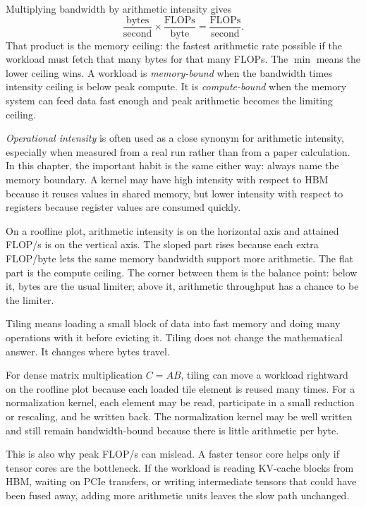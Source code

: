 Multiplying bandwidth by arithmetic intensity gives
\[
  \frac{\text{bytes}}{\text{second}}
  \times
  \frac{\text{FLOPs}}{\text{byte}}
  =
  \frac{\text{FLOPs}}{\text{second}}.
\]
That product is the memory ceiling: the fastest arithmetic rate possible if the workload must fetch that many bytes for that many FLOPs. The \(\min\) means the lower ceiling wins. A workload is \emph{memory-bound} when the bandwidth times intensity ceiling is below peak compute. It is \emph{compute-bound} when the memory system can feed data fast enough and peak arithmetic becomes the limiting ceiling.

\emph{Operational intensity} is often used as a close synonym for arithmetic intensity, especially when measured from a real run rather than from a paper calculation. In this chapter, the important habit is the same either way: always name the memory boundary. A kernel may have high intensity with respect to HBM because it reuses values in shared memory, but lower intensity with respect to registers because register values are consumed quickly.

On a roofline plot, arithmetic intensity is on the horizontal axis and attained FLOP/s is on the vertical axis. The sloped part rises because each extra FLOP/byte lets the same memory bandwidth support more arithmetic. The flat part is the compute ceiling. The corner between them is the balance point: below it, bytes are the usual limiter; above it, arithmetic throughput has a chance to be the limiter.

\begin{aside}
Tiling means loading a small block of data into fast memory and doing many operations with it before evicting it. Tiling does not change the mathematical answer. It changes where bytes travel.
\end{aside}

For dense matrix multiplication \(C = AB\), tiling can move a workload rightward on the roofline plot because each loaded tile element is reused many times. For a normalization kernel, each element may be read, participate in a small reduction or rescaling, and be written back. The normalization kernel may be well written and still remain bandwidth-bound because there is little arithmetic per byte.

This is also why peak FLOP/s can mislead. A faster tensor core helps only if tensor cores are the bottleneck. If the workload is reading KV-cache blocks from HBM, waiting on PCIe transfers, or writing intermediate tensors that could have been fused away, adding more arithmetic units leaves the slow path unchanged.

